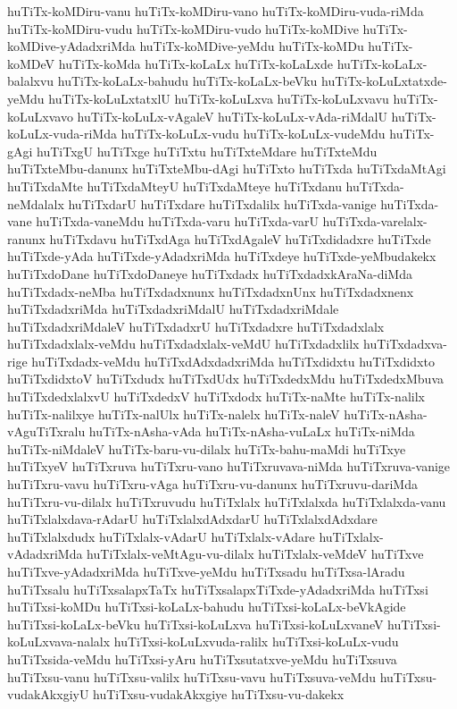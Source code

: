 {huTiTx-koMDiru-vanu
huTiTx-koMDiru-vano
huTiTx-koMDiru-vuda-riMda
huTiTx-koMDiru-vudu
huTiTx-koMDiru-vudo
huTiTx-koMDive
huTiTx-koMDive-yAdadxriMda
huTiTx-koMDive-yeMdu
huTiTx-koMDu
huTiTx-koMDeV
huTiTx-koMda
huTiTx-koLaLx
huTiTx-koLaLxde
huTiTx-koLaLx-balalxvu
huTiTx-koLaLx-bahudu
huTiTx-koLaLx-beVku
huTiTx-koLuLxtatxde-yeMdu
huTiTx-koLuLxtatxlU
huTiTx-koLuLxva
huTiTx-koLuLxvavu
huTiTx-koLuLxvavo
huTiTx-koLuLx-vAgaleV
huTiTx-koLuLx-vAda-riMdalU
huTiTx-koLuLx-vuda-riMda
huTiTx-koLuLx-vudu
huTiTx-koLuLx-vudeMdu
huTiTx-gAgi
huTiTxgU
huTiTxge
huTiTxtu
huTiTxteMdare
huTiTxteMdu
huTiTxteMbu-danunx
huTiTxteMbu-dAgi
huTiTxto
huTiTxda
huTiTxdaMtAgi
huTiTxdaMte
huTiTxdaMteyU
huTiTxdaMteye
huTiTxdanu
huTiTxda-neMdalalx
huTiTxdarU
huTiTxdare
huTiTxdalilx
huTiTxda-vanige
huTiTxda-vane
huTiTxda-vaneMdu
huTiTxda-varu
huTiTxda-varU
huTiTxda-varelalx-ranunx
huTiTxdavu
huTiTxdAga
huTiTxdAgaleV
huTiTxdidadxre
huTiTxde
huTiTxde-yAda
huTiTxde-yAdadxriMda
huTiTxdeye
huTiTxde-yeMbudakekx
huTiTxdoDane
huTiTxdoDaneye
huTiTxdadx
huTiTxdadxkAraNa-diMda
huTiTxdadx-neMba
huTiTxdadxnunx
huTiTxdadxnUnx
huTiTxdadxnenx
huTiTxdadxriMda
huTiTxdadxriMdalU
huTiTxdadxriMdale
huTiTxdadxriMdaleV
huTiTxdadxrU
huTiTxdadxre
huTiTxdadxlalx
huTiTxdadxlalx-veMdu
huTiTxdadxlalx-veMdU
huTiTxdadxlilx
huTiTxdadxva-rige
huTiTxdadx-veMdu
huTiTxdAdxdadxriMda
huTiTxdidxtu
huTiTxdidxto
huTiTxdidxtoV
huTiTxdudx
huTiTxdUdx
huTiTxdedxMdu
huTiTxdedxMbuva
huTiTxdedxlalxvU
huTiTxdedxV
huTiTxdodx
huTiTx-naMte
huTiTx-nalilx
huTiTx-nalilxye
huTiTx-nalUlx
huTiTx-nalelx
huTiTx-naleV
huTiTx-nAsha-vAguTiTxralu
huTiTx-nAsha-vAda
huTiTx-nAsha-vuLaLx
huTiTx-niMda
huTiTx-niMdaleV
huTiTx-baru-vu-dilalx
huTiTx-bahu-maMdi
huTiTxye
huTiTxyeV
huTiTxruva
huTiTxru-vano
huTiTxruvava-niMda
huTiTxruva-vanige
huTiTxru-vavu
huTiTxru-vAga
huTiTxru-vu-danunx
huTiTxruvu-dariMda
huTiTxru-vu-dilalx
huTiTxruvudu
huTiTxlalx
huTiTxlalxda
huTiTxlalxda-vanu
huTiTxlalxdava-rAdarU
huTiTxlalxdAdxdarU
huTiTxlalxdAdxdare
huTiTxlalxdudx
huTiTxlalx-vAdarU
huTiTxlalx-vAdare
huTiTxlalx-vAdadxriMda
huTiTxlalx-veMtAgu-vu-dilalx
huTiTxlalx-veMdeV
huTiTxve
huTiTxve-yAdadxriMda
huTiTxve-yeMdu
huTiTxsadu
huTiTxsa-lAradu
huTiTxsalu
huTiTxsalapxTaTx
huTiTxsalapxTiTxde-yAdadxriMda
huTiTxsi
huTiTxsi-koMDu
huTiTxsi-koLaLx-bahudu
huTiTxsi-koLaLx-beVkAgide
huTiTxsi-koLaLx-beVku
huTiTxsi-koLuLxva
huTiTxsi-koLuLxvaneV
huTiTxsi-koLuLxvava-nalalx
huTiTxsi-koLuLxvuda-ralilx
huTiTxsi-koLuLx-vudu
huTiTxsida-veMdu
huTiTxsi-yAru
huTiTxsutatxve-yeMdu
huTiTxsuva
huTiTxsu-vanu
huTiTxsu-valilx
huTiTxsu-vavu
huTiTxsuva-veMdu
huTiTxsu-vudakAkxgiyU
huTiTxsu-vudakAkxgiye
huTiTxsu-vu-dakekx
}
